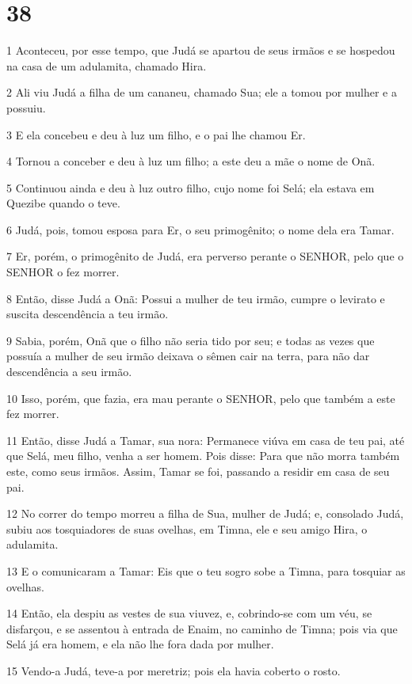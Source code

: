 \chapter{38}

\par 1 Aconteceu, por esse tempo, que Judá se apartou de seus irmãos e se hospedou na casa de um adulamita, chamado Hira.
\par 2 Ali viu Judá a filha de um cananeu, chamado Sua; ele a tomou por mulher e a possuiu.
\par 3 E ela concebeu e deu à luz um filho, e o pai lhe chamou Er.
\par 4 Tornou a conceber e deu à luz um filho; a este deu a mãe o nome de Onã.
\par 5 Continuou ainda e deu à luz outro filho, cujo nome foi Selá; ela estava em Quezibe quando o teve.
\par 6 Judá, pois, tomou esposa para Er, o seu primogênito; o nome dela era Tamar.
\par 7 Er, porém, o primogênito de Judá, era perverso perante o SENHOR, pelo que o SENHOR o fez morrer.
\par 8 Então, disse Judá a Onã: Possui a mulher de teu irmão, cumpre o levirato e suscita descendência a teu irmão.
\par 9 Sabia, porém, Onã que o filho não seria tido por seu; e todas as vezes que possuía a mulher de seu irmão deixava o sêmen cair na terra, para não dar descendência a seu irmão.
\par 10 Isso, porém, que fazia, era mau perante o SENHOR, pelo que também a este fez morrer.
\par 11 Então, disse Judá a Tamar, sua nora: Permanece viúva em casa de teu pai, até que Selá, meu filho, venha a ser homem. Pois disse: Para que não morra também este, como seus irmãos. Assim, Tamar se foi, passando a residir em casa de seu pai.
\par 12 No correr do tempo morreu a filha de Sua, mulher de Judá; e, consolado Judá, subiu aos tosquiadores de suas ovelhas, em Timna, ele e seu amigo Hira, o adulamita.
\par 13 E o comunicaram a Tamar: Eis que o teu sogro sobe a Timna, para tosquiar as ovelhas.
\par 14 Então, ela despiu as vestes de sua viuvez, e, cobrindo-se com um véu, se disfarçou, e se assentou à entrada de Enaim, no caminho de Timna; pois via que Selá já era homem, e ela não lhe fora dada por mulher.
\par 15 Vendo-a Judá, teve-a por meretriz; pois ela havia coberto o rosto.
